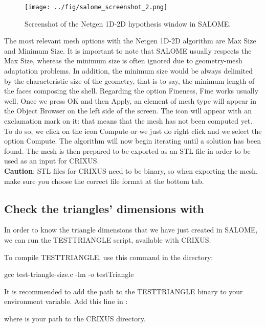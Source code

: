 \documentclass{../GPUSPHtemplate}
\begin{document}
\begin{figure}[h]
  \begin{center}
    \texttt{[image: ../fig/salome\_screenshot\_2.png]}
    \caption{Screenshot of the Netgen 1D-2D hypothesis window in SALOME.}\label{fig:salome_screenshot_2}   
  \end{center}
\end{figure}

The most relevant mesh options with the Netgen 1D-2D algorithm 
are Max Size and Minimum Size. 
It is important to note that SALOME usually respects the Max Size, 
whereas the minimum size is often ignored due to geometry-mesh 
adaptation problems. In addition, the minimum size would be 
always delimited by the characteristic size of the geometry, 
that is to say, the minimum length of the faces composing the shell. 
Regarding the option Fineness, Fine works usually well. 
Once we press OK and then Apply, an element of mesh type 
will appear in the Object Browser on the left side of the screen. 
The icon will appear with an exclamation mark on it: that means 
that the mesh has not been computed yet. To do so, we click on 
the icon Compute or we just do right click and we select 
the option Compute. The algorithm will now begin iterating 
until a solution has been found. 
The mesh is then prepared to be exported as an STL file 
in order to be used as an input for CRIXUS. \\

\textbf{Caution}: STL files for CRIXUS need to be binary, 
so when exporting the mesh, make sure you choose the correct 
file format at the bottom tab.


\subsection{Check the triangles' dimensions with }
In order to know the triangle dimensions that we have just created in SALOME, 
we can run the TESTTRIANGLE script, available with CRIXUS.

To compile TESTTRIANGLE, use this command in the  directory:
\begin{shellcode}
gcc test-triangle-size.c -lm -o testTriangle
\end{shellcode}
It is recommended to add the path to the TESTTRIANGLE binary to your
 environment variable. Add this line in :
where  is your path to the CRIXUS directory.
\end{document}
